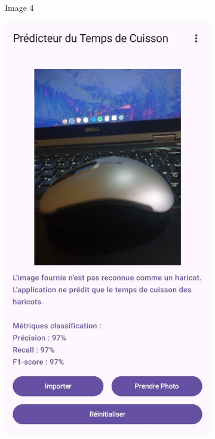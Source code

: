 \begin{figure}[H]
\begin{subfigure}{0.2\textwidth}
        \caption{Image 4}
    \end{subfigure}\hfill
    \begin{subfigure}{0.2\textwidth}
        \centering
        \includegraphics[width=\linewidth]{figures/test2.jpg}

\end{subfigure}
\end{figure}

